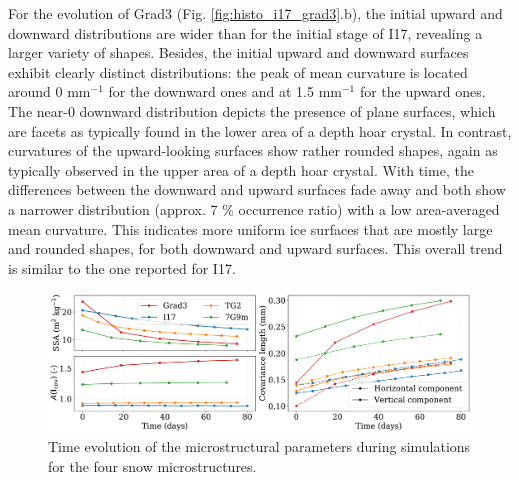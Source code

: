 \documentclass[draft,ms]{agujournal2019}
\begin{document}
For the evolution of Grad3 (Fig. \ref{fig:histo_i17_grad3}.b), the initial upward and downward distributions are wider than for the initial stage of I17, revealing a larger variety of shapes. Besides, the initial upward and downward surfaces exhibit clearly distinct distributions: the peak of mean curvature is located around 0 mm$^{-1}$ for the downward ones and at 1.5 mm$^{-1}$ for the upward ones. The near-0 downward distribution depicts the presence of plane surfaces, which are facets as typically found in the lower area of a depth hoar crystal. In contrast, curvatures of the upward-looking surfaces show rather rounded shapes, again as typically observed in the upper area of a depth hoar crystal. With time, the differences between the downward and upward surfaces fade away and both show a narrower distribution (approx. 7 \% occurrence ratio) with a low area-averaged mean curvature. This indicates more uniform ice surfaces that are mostly large and rounded shapes, for both downward and upward surfaces. This overall trend is similar to the one reported for I17.\\

\begin{figure}
    \centering
    \includegraphics[width=\linewidth]{Figures/4images_microstruct_new.pdf}
    \caption{Time evolution of the microstructural parameters during simulations for the four snow microstructures.}
    \label{fig:4_images_microstruct}
\end{figure}
\end{document}
